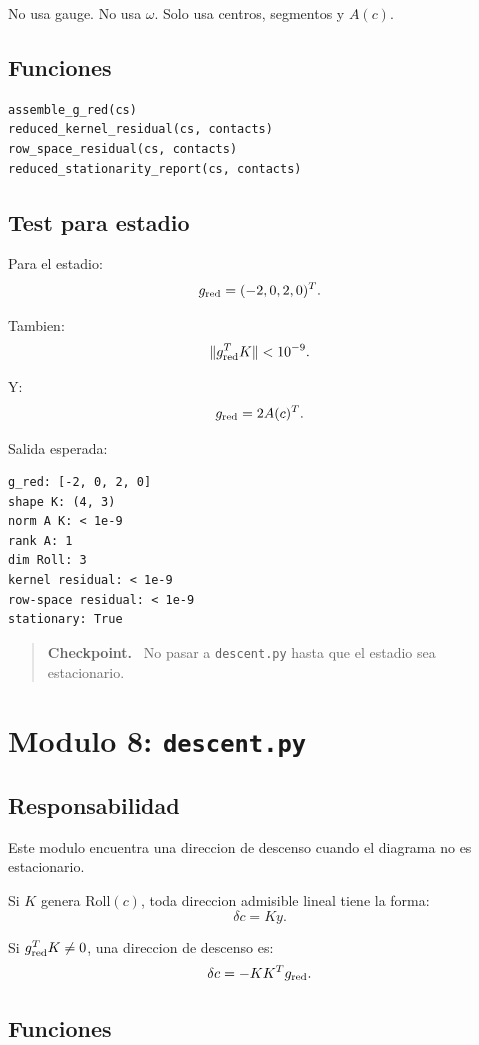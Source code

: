 \documentclass[11pt,letterpaper]{amsart}
\newcommand{\Roll}{\mathrm{Roll}}
\newenvironment{checkpoint}
{\par\medskip\noindent\begin{quote}\textbf{Checkpoint.}\ }
{\end{quote}\par\medskip}
\begin{document}
No usa gauge. No usa \(\omega\). Solo usa centros, segmentos y \(A(c)\).

\subsection{Funciones}

\begin{verbatim}
assemble_g_red(cs)
reduced_kernel_residual(cs, contacts)
row_space_residual(cs, contacts)
reduced_stationarity_report(cs, contacts)
\end{verbatim}

\subsection{Test para estadio}

Para el estadio:
\[
g_{\rm red}=(-2,0,2,0)^T.
\]

Tambien:
\[
\|g_{\rm red}^TK\|<10^{-9}.
\]

Y:
\[
g_{\rm red}=2A(c)^T.
\]

Salida esperada:
\begin{verbatim}
g_red: [-2, 0, 2, 0]
shape K: (4, 3)
norm A K: < 1e-9
rank A: 1
dim Roll: 3
kernel residual: < 1e-9
row-space residual: < 1e-9
stationary: True
\end{verbatim}

\begin{checkpoint}
No pasar a \texttt{descent.py} hasta que el estadio sea estacionario.
\end{checkpoint}

\section{Modulo 8: \texttt{descent.py}}

\subsection{Responsabilidad}

Este modulo encuentra una direccion de descenso cuando el diagrama no es
estacionario.

Si \(K\) genera \(\Roll(c)\), toda direccion admisible lineal tiene la forma:
\[
\delta c=Ky.
\]

Si \(g_{\rm red}^TK\neq0\), una direccion de descenso es:
\[
\delta c=-KK^Tg_{\rm red}.
\]

\subsection{Funciones}
\end{document}
